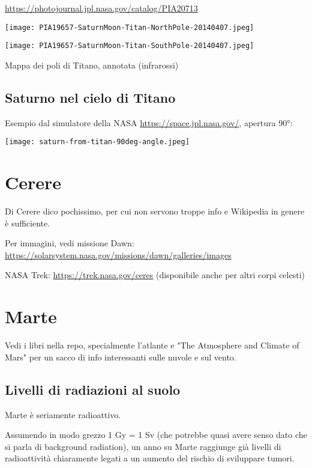 \documentclass[a4paper,10pt,openany,oneside]{memoir}
\begin{document}
\url{https://photojournal.jpl.nasa.gov/catalog/PIA20713}


\texttt{[image: PIA19657-SaturnMoon-Titan-NorthPole-20140407.jpeg]}

\texttt{[image: PIA19657-SaturnMoon-Titan-SouthPole-20140407.jpeg]}

Mappa dei poli di Titano, annotata (infrarossi)

\section{Saturno nel cielo di Titano}

Esempio dal simulatore della NASA \url{https://space.jpl.nasa.gov/}, apertura 90°:

\texttt{[image: saturn-from-titan-90deg-angle.jpeg]}



\chapter{Cerere}

Di Cerere dico pochissimo, per cui non servono troppe info e Wikipedia in genere è sufficiente.

Per immagini, vedi missione Dawn: \url{https://solarsystem.nasa.gov/missions/dawn/galleries/images}

NASA Trek: \url{https://trek.nasa.gov/ceres} (disponibile anche per altri corpi celesti)




\chapter{Marte}

Vedi i libri nella repo, specialmente l'atlante e "The Atmosphere and Climate of Mars" per un sacco di info interessanti sulle nuvole e sul vento.

\section{Livelli di radiazioni al suolo}

Marte è seriamente radioattivo.

Assumendo in modo grezzo 1 Gy = 1 Sv (che potrebbe quasi avere senso dato che si parla di background radiation), un anno su Marte raggiunge già livelli di radioattività chiaramente legati a un aumento del rischio di sviluppare tumori.
\end{document}
